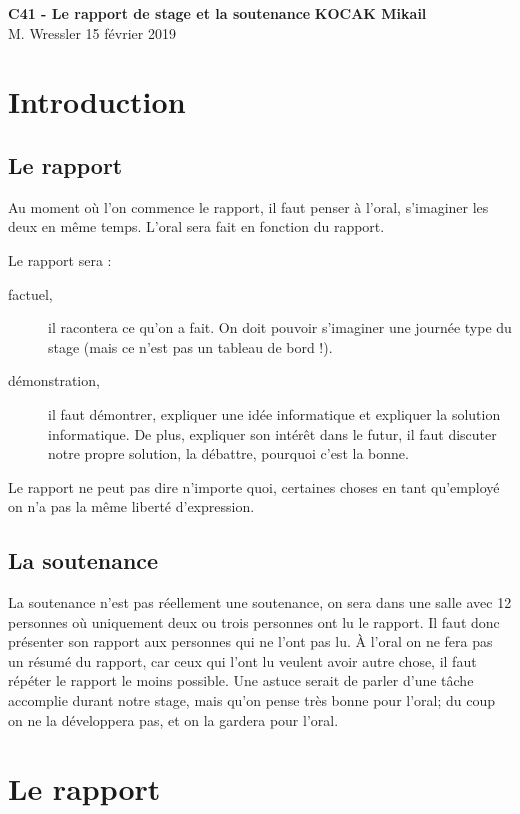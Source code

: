 \documentclass[final, a4paper, 11pt]{article}
\begin{document}
\noindent
\large\textbf{C41 - Le rapport de stage et la soutenance} \hfill \textbf{KOCAK Mikail} \\
\normalsize M. Wressler \hfill 15 février 2019 \\[1pt]

\tableofcontents

\section{Introduction}
\subsection{Le rapport}
Au moment où l'on commence le rapport, il faut penser à l'oral, s'imaginer les deux en même temps. L'oral sera fait en fonction du rapport.

Le rapport sera :
\begin{description}
	\item[factuel,] il racontera ce qu'on a fait. On doit pouvoir s'imaginer une journée type du stage (mais ce n'est pas un tableau de bord !).
	
	\item[démonstration,] il faut démontrer, expliquer une idée informatique et expliquer la solution informatique. De plus, expliquer son intérêt dans le futur, il faut discuter notre propre solution, la débattre, pourquoi c'est la bonne.
\end{description}

Le rapport ne peut pas dire n'importe quoi, certaines choses en tant qu'employé on n'a pas la même liberté d'expression.

\subsection{La soutenance}
La soutenance n'est pas réellement une soutenance, on sera dans une salle avec 12 personnes où uniquement deux ou trois personnes ont lu le rapport. Il faut donc présenter son rapport aux personnes qui ne l'ont pas lu. À l'oral on ne fera pas un résumé du rapport, car ceux qui l'ont lu veulent avoir autre chose, il faut répéter le rapport le moins possible. Une astuce serait de parler d'une tâche accomplie durant notre stage, mais qu'on pense très bonne pour l'oral; du coup on ne la développera pas, et on la gardera pour l'oral.

\section{Le rapport}
\end{document}
